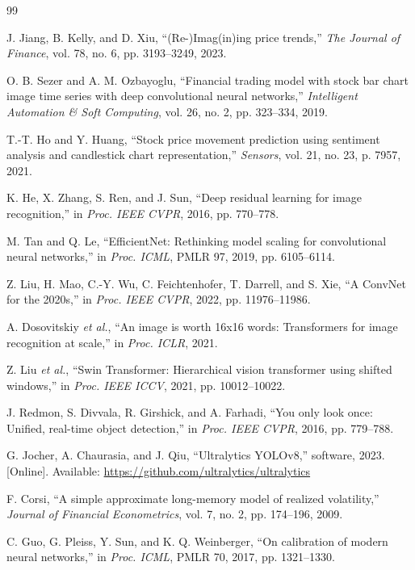 \documentclass[11pt,a4paper]{article}
\begin{document}
\begin{thebibliography}{99}

 J. Jiang, B. Kelly, and D. Xiu, ``(Re-)Imag(in)ing price trends,'' \emph{The Journal of Finance}, vol. 78, no. 6, pp. 3193--3249, 2023.

 O. B. Sezer and A. M. Ozbayoglu, ``Financial trading model with stock bar chart image time series with deep convolutional neural networks,'' \emph{Intelligent Automation \& Soft Computing}, vol. 26, no. 2, pp. 323--334, 2019.

 T.-T. Ho and Y. Huang, ``Stock price movement prediction using sentiment analysis and candlestick chart representation,'' \emph{Sensors}, vol. 21, no. 23, p. 7957, 2021.

 K. He, X. Zhang, S. Ren, and J. Sun, ``Deep residual learning for image recognition,'' in \emph{Proc. IEEE CVPR}, 2016, pp. 770--778.

 M. Tan and Q. Le, ``EfficientNet: Rethinking model scaling for convolutional neural networks,'' in \emph{Proc. ICML}, PMLR 97, 2019, pp. 6105--6114.

 Z. Liu, H. Mao, C.-Y. Wu, C. Feichtenhofer, T. Darrell, and S. Xie, ``A ConvNet for the 2020s,'' in \emph{Proc. IEEE CVPR}, 2022, pp. 11976--11986.

 A. Dosovitskiy \emph{et al.}, ``An image is worth 16x16 words: Transformers for image recognition at scale,'' in \emph{Proc. ICLR}, 2021.

 Z. Liu \emph{et al.}, ``Swin Transformer: Hierarchical vision transformer using shifted windows,'' in \emph{Proc. IEEE ICCV}, 2021, pp. 10012--10022.

 J. Redmon, S. Divvala, R. Girshick, and A. Farhadi, ``You only look once: Unified, real-time object detection,'' in \emph{Proc. IEEE CVPR}, 2016, pp. 779--788.

 G. Jocher, A. Chaurasia, and J. Qiu, ``Ultralytics YOLOv8,'' software, 2023. [Online]. Available: \url{https://github.com/ultralytics/ultralytics}

 F. Corsi, ``A simple approximate long-memory model of realized volatility,'' \emph{Journal of Financial Econometrics}, vol. 7, no. 2, pp. 174--196, 2009.

 C. Guo, G. Pleiss, Y. Sun, and K. Q. Weinberger, ``On calibration of modern neural networks,'' in \emph{Proc. ICML}, PMLR 70, 2017, pp. 1321--1330.


\end{thebibliography}
\end{document}
